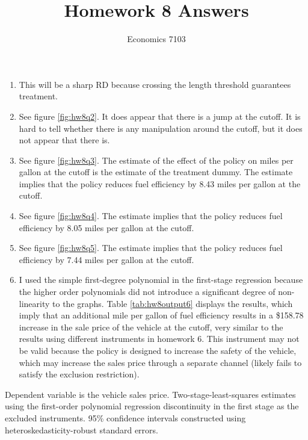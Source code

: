 \documentclass{article}
\title{Homework 8 Answers}
\author{Economics 7103}
\date{ }
\begin{document}
  
\maketitle

\begin{enumerate}
    \item This will be a sharp RD because crossing the length threshold guarantees treatment. 
    \item See figure \ref{fig:hw8q2}.  It does appear that there is a jump at the cutoff.  It is hard to tell whether there is any manipulation around the cutoff, but it does not appear that there is.
    \item See figure \ref{fig:hw8q3}.  The estimate of the effect of the policy on miles per gallon at the cutoff is the estimate of the treatment dummy.  The estimate implies that the policy reduces fuel efficiency by 8.43 miles per gallon at the cutoff.
    \item See figure \ref{fig:hw8q4}.  The estimate implies that the policy reduces fuel efficiency by 8.05 miles per gallon at the cutoff.
    \item See figure \ref{fig:hw8q5}.  The estimate implies that the policy reduces fuel efficiency by 7.44 miles per gallon at the cutoff.
    \item I used the simple first-degree polynomial in the first-stage regression because the higher order polynomials did not introduce a significant degree of non-linearity to the graphs.  Table \ref{tab:hw8output6} displays the results, which imply that an additional mile per gallon of fuel efficiency results in a \$158.78 increase in the sale price of the vehicle at the cutoff, very similar to the results using different instruments in homework 6.  This instrument may not be valid because the policy is designed to increase the safety of the vehicle, which may increase the sales price through a separate channel (likely fails to satisfy the exclusion restriction).
\end{enumerate}

\begin{table}[ht]
    \centering
   
    \caption{Dependent variable is the vehicle sales price. Two-stage-least-squares estimates using the first-order polynomial regression discontinuity in the first stage as the excluded instruments.  95\% confidence intervals constructed using heteroskedasticity-robust standard errors.}
    \label{tab:hw8output6}
\end{table}
\end{document}

